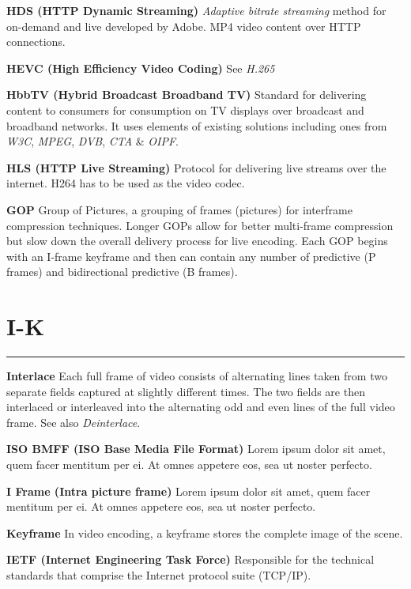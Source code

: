 \smallskip
\textbf{HDS (HTTP Dynamic Streaming)}
\textit{Adaptive bitrate streaming} method for on-demand and live developed by Adobe. MP4 video content over HTTP connections.

\smallskip
\textbf{HEVC (High Efficiency Video Coding)}
See \textit{H.265}

\smallskip
\textbf{HbbTV (Hybrid Broadcast Broadband TV)}
Standard for delivering content to consumers for consumption on TV displays over broadcast and broadband networks. It uses elements of existing solutions including ones from \textit{W3C}, \textit{MPEG}, \textit{DVB}, \textit{CTA} \& \textit{OIPF}.

\smallskip
\textbf{HLS (HTTP Live Streaming)}
Protocol for delivering live streams over the internet.
H264 has to be used as the video codec.



\smallskip
\textbf{GOP}
Group of Pictures, a grouping of frames (pictures) for interframe compression techniques. Longer GOPs allow for better multi-frame compression but slow down the overall delivery process for live encoding. Each GOP begins with an I-frame keyframe and then can contain any number of predictive (P frames) and bidirectional predictive (B frames).


\section{I-K}
\hrule

\smallskip
\textbf{Interlace}
Each full frame of video consists of alternating lines taken from two separate fields captured at slightly different times. The two fields are then interlaced or interleaved into the alternating odd and even lines of the full video frame.  See also \textit{Deinterlace}.

\smallskip
\textbf{ISO BMFF (ISO Base Media File Format)}
Lorem ipsum dolor sit amet, quem facer mentitum per ei. At omnes appetere eos, sea ut noster perfecto.

\smallskip
\textbf{I Frame (Intra picture frame)}
Lorem ipsum dolor sit amet, quem facer mentitum per ei. At omnes appetere eos, sea ut noster perfecto.

\smallskip
\textbf{Keyframe}
In video encoding, a keyframe stores the complete image of the scene.

\smallskip
\textbf{IETF (Internet Engineering Task Force)}
Responsible for the technical standards that comprise the Internet protocol suite (TCP/IP).

